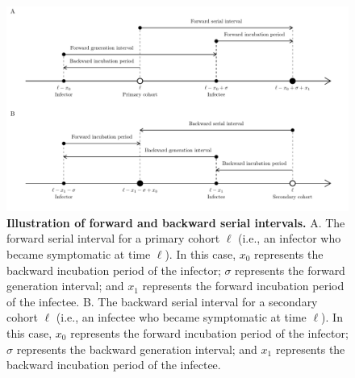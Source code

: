 \documentclass[12pt]{article}
\begin{document}
\begin{figure}[!th]
\includegraphics[width=\textwidth]{serial_guide.pdf}
\caption{
\textbf{Illustration of forward and backward serial intervals.}
A. The forward serial interval for a primary cohort $\ell$ (i.e., an infector who became symptomatic at time $\ell$).
In this case, $x_0$ represents the backward incubation period of the infector;
$\sigma$ represents the forward generation interval;
and $x_1$ represents the forward incubation period of the infectee.
B. The backward serial interval for a secondary cohort $\ell$ (i.e., an infectee who became symptomatic at time $\ell$).
In this case, $x_0$ represents the forward incubation period of the infector;
$\sigma$ represents the backward generation interval;
and $x_1$ represents the backward incubation period of the infectee.
}
\label{fig:diagram}
\end{figure}
\end{document}
